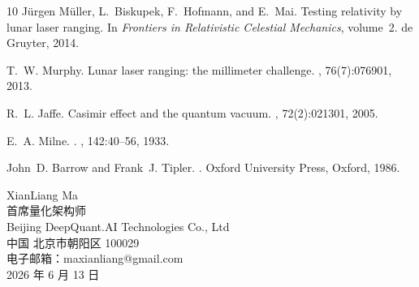 \documentclass[12pt,leqno]{article}
\begin{document}
\begin{thebibliography}{10}
		Jürgen Müller, L.~Biskupek, F.~Hofmann, and E.~Mai.
		\newblock Testing relativity by lunar laser ranging.
		\newblock In {\em Frontiers in Relativistic Celestial Mechanics}, volume~2. de
		Gruyter, 2014.
		
		T.~W. Murphy.
		\newblock Lunar laser ranging: the millimeter challenge.
		, 76(7):076901, 2013.
		
		R.~L. Jaffe.
		\newblock Casimir effect and the quantum vacuum.
		, 72(2):021301, 2005.
		
		E.~A. Milne.
		.
		,
		142:40--56, 1933.
		
		John~D. Barrow and Frank~J. Tipler.
		.
		\newblock Oxford University Press, Oxford, 1986.
		
	\end{thebibliography}
	\newpage
	\linespread{1}\selectfont
		
	\vskip 0.6in
	\noindent
	XianLiang Ma\\[10pt]
	首席量化架构师\\[2pt]
	Beijing DeepQuant.AI Technologies Co., Ltd\\[2pt]
	中国 北京市朝阳区 100029\\[10pt]
	电子邮箱：maxianliang@gmail.com\\[10pt]
	2026 年 6 月 13 日
	
	\vskip 0.1in
\end{document}
